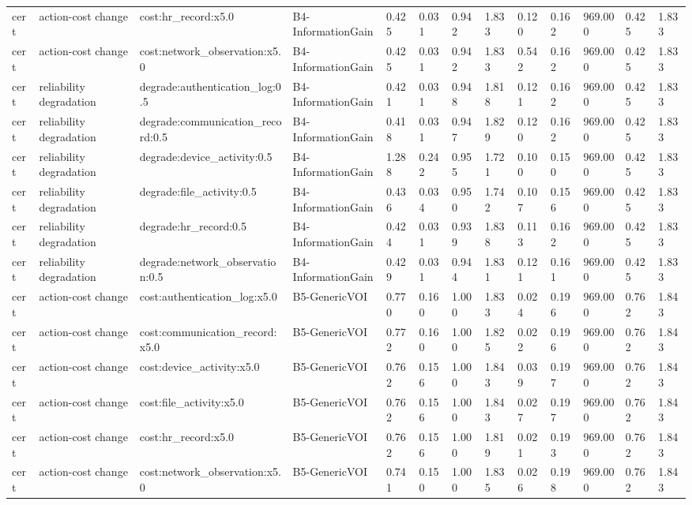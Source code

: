 \begin{table}[!ht]
{\begin{tabular}{lllllllllllll}
cert & action-cost change & cost:hr\_record:x5.0 & B4-InformationGain & 0.425 & 0.031 & 0.942 & 1.833 & 0.120 & 0.162 & 969.000 & 0.425 & 1.833 \\
cert & action-cost change & cost:network\_observation:x5.0 & B4-InformationGain & 0.425 & 0.031 & 0.942 & 1.833 & 0.542 & 0.162 & 969.000 & 0.425 & 1.833 \\
cert & reliability degradation & degrade:authentication\_log:0.5 & B4-InformationGain & 0.421 & 0.031 & 0.948 & 1.818 & 0.121 & 0.162 & 969.000 & 0.425 & 1.833 \\
cert & reliability degradation & degrade:communication\_record:0.5 & B4-InformationGain & 0.418 & 0.031 & 0.947 & 1.829 & 0.120 & 0.162 & 969.000 & 0.425 & 1.833 \\
cert & reliability degradation & degrade:device\_activity:0.5 & B4-InformationGain & 1.288 & 0.242 & 0.955 & 1.721 & 0.100 & 0.150 & 969.000 & 0.425 & 1.833 \\
cert & reliability degradation & degrade:file\_activity:0.5 & B4-InformationGain & 0.436 & 0.034 & 0.950 & 1.742 & 0.107 & 0.156 & 969.000 & 0.425 & 1.833 \\
cert & reliability degradation & degrade:hr\_record:0.5 & B4-InformationGain & 0.424 & 0.031 & 0.939 & 1.838 & 0.113 & 0.162 & 969.000 & 0.425 & 1.833 \\
cert & reliability degradation & degrade:network\_observation:0.5 & B4-InformationGain & 0.429 & 0.031 & 0.944 & 1.831 & 0.121 & 0.161 & 969.000 & 0.425 & 1.833 \\
cert & action-cost change & cost:authentication\_log:x5.0 & B5-GenericVOI & 0.770 & 0.160 & 1.000 & 1.833 & 0.024 & 0.196 & 969.000 & 0.762 & 1.843 \\
cert & action-cost change & cost:communication\_record:x5.0 & B5-GenericVOI & 0.772 & 0.160 & 1.000 & 1.825 & 0.022 & 0.196 & 969.000 & 0.762 & 1.843 \\
cert & action-cost change & cost:device\_activity:x5.0 & B5-GenericVOI & 0.762 & 0.156 & 1.000 & 1.843 & 0.039 & 0.197 & 969.000 & 0.762 & 1.843 \\
cert & action-cost change & cost:file\_activity:x5.0 & B5-GenericVOI & 0.762 & 0.156 & 1.000 & 1.843 & 0.027 & 0.197 & 969.000 & 0.762 & 1.843 \\
cert & action-cost change & cost:hr\_record:x5.0 & B5-GenericVOI & 0.762 & 0.156 & 1.000 & 1.819 & 0.021 & 0.193 & 969.000 & 0.762 & 1.843 \\
cert & action-cost change & cost:network\_observation:x5.0 & B5-GenericVOI & 0.741 & 0.150 & 1.000 & 1.835 & 0.026 & 0.198 & 969.000 & 0.762 & 1.843 \\

\end{tabular}}
\end{table}

